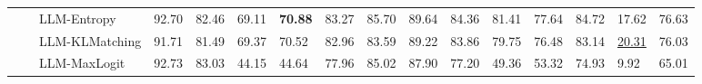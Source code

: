 \begin{table}[ht!]
\begin{tabularx}{\textwidth}{@{}l l l |l *{11}{Y}|Y@{}}
 &  & LLM-Entropy & 92.70 & 82.46 & 69.11 & \textbf{70.88} & 83.27 & 85.70 & 89.64 & 84.36 & 81.41 & 77.64 & 84.72 & 17.62 & 76.63 \\
 &  & LLM-KLMatching & 91.71 & 81.49 & 69.37 & 70.52 & 82.96 & 83.59 & 89.22 & 83.86 & 79.75 & 76.48 & 83.14 & \underline{20.31} & 76.03 \\
 &  & LLM-MaxLogit & 92.73 & 83.03 & 44.15 & 44.64 & 77.96 & 85.02 & 87.90 & 77.20 & 49.36 & 53.32 & 74.93 & 9.92 & 65.01 \\
\bottomrule
\end{tabularx}
\label{table::openset_LCR0.5}
\end{table}
